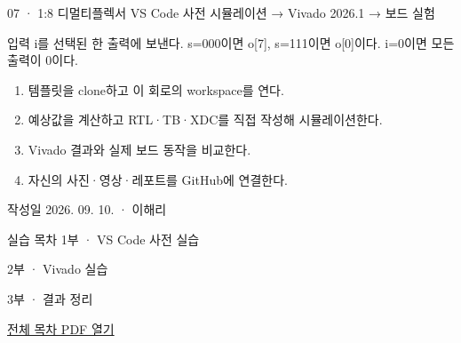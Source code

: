 
\renewcommand{\labonehome}{\hyperlink{modern-07-contents}{\contentsbutton}}
\renewcommand{\legacySource}[1]{}
\providecommand{\terminalbox}[1]{\par\vspace{0.15cm}{\setlength{\fboxsep}{7pt}\colorbox{black}{\parbox{\dimexpr\textwidth-14pt\relax}{\color{white}\ttfamily\fontsize{7}{9}\selectfont #1}}}\par\vspace{0.15cm}}

\begingroup
\renewcommand{\small}{\fontsize{9}{11}\selectfont}
\begin{frame}{07 · 1:8 디멀티플렉서}\relax
\small
VS Code 사전 시뮬레이션 → Vivado 2026.1 → 보드 실험\par\vspace{0.22cm}입력 i를 선택된 한 출력에 보낸다. s=000이면 o[7], s=111이면 o[0]이다. i=0이면 모든 출력이 0이다.\par\begin{enumerate}\setlength{\itemsep}{0.22cm}
\item 템플릿을 clone하고 이 회로의 workspace를 연다.
\item 예상값을 계산하고 RTL·TB·XDC를 직접 작성해 시뮬레이션한다.
\item Vivado 결과와 실제 보드 동작을 비교한다.
\item 자신의 사진·영상·레포트를 GitHub에 연결한다.
\end{enumerate}
작성일 2026. 09. 10. · 이해리\par
\end{frame}

\begin{frame}[label=modern-07-contents]{실습 목차}\relax
\small
1부 · VS Code 사전 실습\par{}\par\vspace{0.2cm}
\par\vspace{0.4cm}
2부 · Vivado 실습\par{}\par\vspace{0.4cm}
3부 · 결과 정리\par{}\par\vspace{0.35cm}
\href{04.LAB1_00_CONTENTS.pdf}{전체 목차 PDF 열기}
\end{frame}

